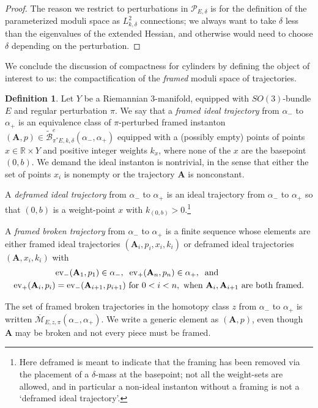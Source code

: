 \documentclass[10pt,a4paper]{amsart}
\newcommand{\pE}{\pi^* \! E}
\theoremstyle{definition}
\newtheorem{definition}[theorem]{Definition}
\theoremstyle{remark}
\numberwithin{figure}{qchap}
\begin{document}
\begin{proof}
The reason we restrict to perturbations in $\mathcal P_{E,\delta}$ is for the definition of the parameterized moduli space as $L^2_{k,\delta}$ connections; we always want to take $\delta$ less than the eigenvalues of the extended Hessian, and otherwise would need to choose $\delta$ depending on the perturbation.
\end{proof}

We conclude the discussion of compactness for cylinders by defining the object of interest to us: the compactification of the \emph{framed} moduli space of trajectories.

\begin{definition}Let $Y$ be a Riemannian 3-manifold, equipped with $SO(3)$-bundle $E$ and regular perturbation $\pi$. We say that a \emph{framed ideal trajectory} from $\alpha_-$ to $\alpha_+$ is an equivalence class of $\pi$-perturbed framed instanton $(\mathbf A,p) \in \widetilde{\mathcal B}^e_{\pE,k,\delta}(\alpha_-,\alpha_+)$ equipped with a (possibly empty) points of points $x \in \mathbb R \times Y$ and positive integer weights $k_x$, where none of the $x$ are the basepoint $(0,b)$. We demand the ideal instanton is nontrivial, in the sense that either the set of points $x_i$ is nonempty or the trajectory $\mathbf{A}$ is nonconstant.

A \emph{deframed ideal trajectory} from $\alpha_-$ to $\alpha_+$ is an ideal trajectory from $\alpha_-$ to $\alpha_+$ so that $(0,b)$ is a weight-point $x$ with $k_{(0,b)} > 0$.\footnote{Here deframed is meant to indicate that the framing has been removed via the placement of a $\delta$-mass at the basepoint; not all the weight-sets are allowed, and in particular a non-ideal instanton without a framing is not a `deframed ideal trajectory'.}

A \emph{framed broken trajectory} from $\alpha_-$ to $\alpha_+$ is a finite sequence whose elements are either framed ideal trajectories $(\mathbf{A}_i,p_i,x_i, k_i)$ or deframed ideal trajectories $(\mathbf{A},x_i,k_i)$ with
\begin{align*}&\textup{ev}_-(\mathbf{A}_1,p_1) \in \alpha_-, \; \; \textup{ev}_+ (\mathbf{A}_n,p_n) \in \alpha_+, \;\; \textup{and}\\
\textup{ev}_+ (\mathbf{A}_i,p_i) &= \textup{ev}_- (\mathbf{A}_{i+1},p_{i+1}) \textup{  for }0 < i < n,\textup{ when } \mathbf{A}_i, \mathbf{A}_{i+1} \textup{ are both framed}.\end{align*}

The set of framed broken trajectories in the homotopy class $z$ from $\alpha_-$ to $\alpha_+$ is written $\overline{\mathcal M}_{E,z,\pi}(\alpha_-, \alpha_+)$. We write a generic element as $(\mathbf{A},p)$, even though $\mathbf{A}$ may be broken and not every piece must be framed.
\end{definition}
\end{document}

